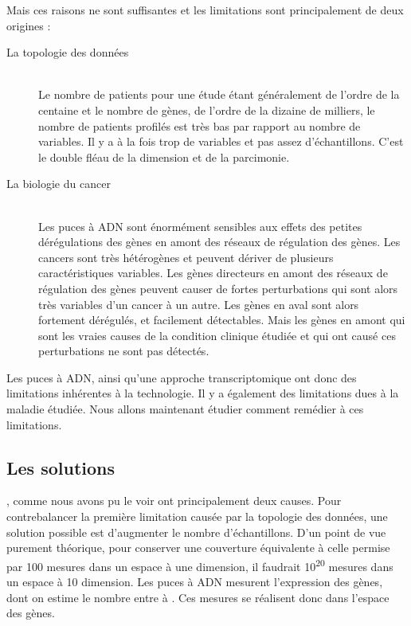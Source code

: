 			 Mais ces raisons ne sont suffisantes et les limitations sont principalement de deux origines :
			\begin{description}
				\item [La topologie des données]   \hfill \\
					Le nombre de patients pour une étude étant généralement de l'ordre de la centaine et le nombre de gènes, de l'ordre de la dizaine de milliers, le nombre de patients profilés est très bas par rapport au nombre de variables.
					Il y a à la fois trop de variables et pas assez d'échantillons.
					C'est le double fléau de la dimension et de la parcimonie.
				\item [La biologie du cancer]      \hfill \\
					Les puces à \acs{ADN} sont énormément sensibles aux effets des petites dérégulations des gènes en amont des réseaux de régulation des gènes.
					Les cancers sont très hétérogènes et peuvent dériver de plusieurs caractéristiques variables.
					Les gènes directeurs en amont des réseaux de régulation des gènes peuvent causer de fortes perturbations qui sont alors très variables d'un cancer à un autre.
					Les gènes en aval sont alors fortement dérégulés, et facilement détectables.
					Mais les gènes en amont qui sont les vraies causes de la condition clinique étudiée et qui ont causé ces perturbations ne sont pas détectés.
			\end{description}
			\vspace{1.5ex}

			Les puces à \acs{ADN}, ainsi qu'une approche transcriptomique ont donc des limitations inhérentes à la technologie.
			Il y a également des limitations dues à la maladie étudiée.
			Nous allons maintenant étudier comment remédier à ces limitations.

		\subsection{\textcolor{myred}{Les solutions}}

			, comme nous avons pu le voir ont principalement deux causes.
			Pour contrebalancer la première limitation causée par la topologie des données, une solution possible est d'augmenter le nombre d'échantillons.
			D'un point de vue purement théorique, pour conserver une couverture équivalente à celle permise par 100 mesures dans un espace à une dimension, il faudrait 10\textsuperscript{20} mesures dans un espace à 10 dimension.
			Les puces à \acs{ADN} mesurent l'expression des gènes, dont on estime le nombre entre  à .
			Ces mesures se réalisent donc dans l'espace des gènes.

